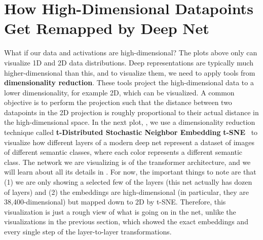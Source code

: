 \section{How High-Dimensional Datapoints Get Remapped by Deep Net}
What if our data and activations are high-dimensional? The plots above only can visualize 1D and 2D data distributions. Deep representations are typically much higher-dimensional than this, and to visualize them, we need to apply tools from {\bf dimensionality reduction}. These tools project the high-dimensional data to a lower dimensionality, for example 2D, which can be visualized. A common objective is to perform the projection such that the distance between two datapoints in the 2D projection is roughly proportional to their actual distance in the high-dimensional space. In the next plot, \fig{\ref{fig:neural_nets:vit_mapping_plot}}, we use a dimensionality reduction technique called \textbf{t-Distributed Stochastic Neighbor Embedding} \textbf{t-SNE}~\cite{tsne} to visualize how different layers of a modern deep net represent a dataset of images of different semantic classes, where each color represents a different semantic class. The network we are visualizing is of the transformer architecture, and we will learn about all its details in \chap{\ref{chapter:transformers}}. For now, the important things to note are that (1) we are only showing a selected few of the layers (this net actually has dozen of layers) and (2) the embeddings are high-dimensional (in particular, they are 38,400-dimensional) but mapped down to 2D by t-SNE. Therefore, this visualization is just a rough view of what is going on in the net, unlike the visualizations in the previous section, which showed the exact embeddings and every single step of the layer-to-layer transformations.
